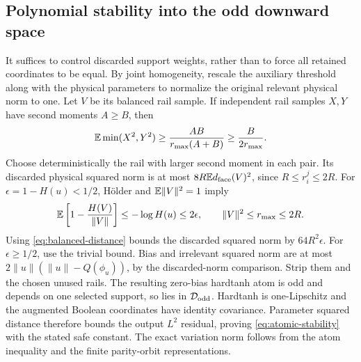 \subsection{Polynomial stability into the odd downward space}

It suffices to control discarded support weights, rather than to force
all retained coordinates to be equal. By joint homogeneity, rescale the auxiliary threshold along with the
physical parameters to normalize the original relevant physical norm
to one. Let $V$ be its balanced rail sample. If
independent rail samples $X,Y$ have second moments $A\ge B$, then
\[
 \mathbb E\min(X^2,Y^2)\ge\frac{AB}{r_{\max}(A+B)}
                    \ge\frac B{2r_{\max}}.
\]
Choose deterministically the rail with larger second moment in each
pair. Its discarded physical squared norm is at most
$8R\mathbb E d_{\rm face}(V)^2$, since $R\le r_i^j\le2R$.
For $\epsilon=1-H(u)<1/2$, H\"older and $\mathbb E\|V\|^2=1$ imply
\[
 \mathbb E\left[1-\frac{H(V)}{\|V\|}\right]
 \le-\log H(u)\le2\epsilon,
 \qquad \|V\|^2\le r_{\max}\le2R.
\]
Using \eqref{eq:balanced-distance} bounds the discarded squared norm
by $64R^2\epsilon$. For $\epsilon\ge1/2$, use the trivial bound.
Bias and irrelevant squared norm are at most
$2\|u\|(\|u\|-Q(\phi_u))$, by the discarded-norm comparison.
Strip them and the chosen unused rails. The resulting zero-bias
hardtanh atom is odd and depends on one selected support, so lies in
$\mathcal D_{\rm odd}$. Hardtanh is one-Lipschitz and the augmented
Boolean coordinates have identity covariance. Parameter squared
distance therefore bounds the output $L^2$ residual, proving
\eqref{eq:atomic-stability} with the stated safe constant.
The exact variation norm follows from the atom inequality and the
finite parity-orbit representations.
